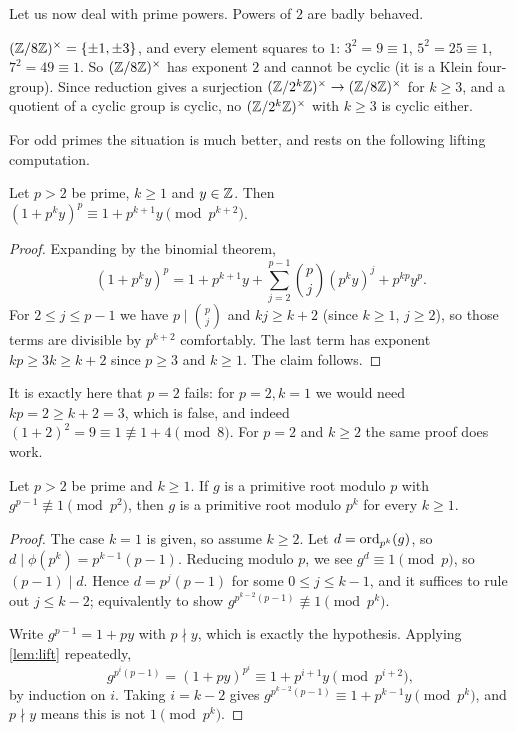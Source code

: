 \documentclass[a4paper]{scrartcl}
\begin{document}
Let us now deal with prime powers. Powers of $2$ are badly behaved.

\begin{example}
	$(\mathbb{Z}/8\mathbb{Z})^\times = \{\pm 1, \pm 3\}$, and every element squares to $1$: $3^2 = 9 \equiv 1$, $5^2 = 25 \equiv 1$, $7^2 = 49 \equiv 1$. So $(\mathbb{Z}/8\mathbb{Z})^\times$ has exponent $2$ and cannot be cyclic (it is a Klein four-group). Since reduction gives a surjection $(\mathbb{Z}/2^k\mathbb{Z})^\times \to (\mathbb{Z}/8\mathbb{Z})^\times$ for $k \geq 3$, and a quotient of a cyclic group is cyclic, no $(\mathbb{Z}/2^k\mathbb{Z})^\times$ with $k \geq 3$ is cyclic either.
\end{example}

For odd primes the situation is much better, and rests on the following lifting computation.

\begin{lemma}\label{lem:lift}
	Let $p > 2$ be prime, $k \geq 1$ and $y \in \mathbb{Z}$. Then $(1 + p^k y)^p \equiv 1 + p^{k+1}y \pmod{p^{k+2}}$.
\end{lemma}
\begin{proof}
	Expanding by the binomial theorem,
	$$
	(1 + p^k y)^p = 1 + p^{k+1}y + \sum_{j = 2}^{p-1} \binom{p}{j}(p^k y)^j + p^{kp}y^p.
	$$
	For $2 \leq j \leq p - 1$ we have $p \mid \binom pj$ and $kj \geq k + 2$ (since $k \geq 1$, $j \geq 2$), so those terms are divisible by $p^{k+2}$ comfortably. The last term has exponent $kp \geq 3k \geq k + 2$ since $p \geq 3$ and $k \geq 1$. The claim follows.
\end{proof}

\begin{remark}
	It is exactly here that $p = 2$ fails: for $p = 2, k = 1$ we would need $kp = 2 \geq k + 2 = 3$, which is false, and indeed $(1 + 2)^2 = 9 \equiv 1 \not\equiv 1 + 4 \pmod 8$. For $p = 2$ and $k \geq 2$ the same proof does work.
\end{remark}

\begin{lemma}\label{lem:primroot2}
	Let $p > 2$ be prime and $k \geq 1$. If $g$ is a primitive root modulo $p$ with $g^{p-1} \not\equiv 1 \pmod{p^2}$, then $g$ is a primitive root modulo $p^k$ for every $k \geq 1$.
\end{lemma}
\begin{proof}
	The case $k = 1$ is given, so assume $k \geq 2$. Let $d = \operatorname{ord}_{p^k}(g)$, so $d \mid \phi(p^k) = p^{k-1}(p-1)$. Reducing modulo $p$, we see $g^d \equiv 1 \pmod p$, so $(p - 1) \mid d$. Hence $d = p^{j}(p-1)$ for some $0 \leq j \leq k - 1$, and it suffices to rule out $j \leq k - 2$; equivalently to show $g^{p^{k-2}(p-1)} \not\equiv 1 \pmod{p^k}$.

	Write $g^{p-1} = 1 + py$ with $p \nmid y$, which is exactly the hypothesis. Applying \autoref{lem:lift} repeatedly,
	$$
	g^{p^{i}(p-1)} = (1 + py)^{p^i} \equiv 1 + p^{i+1}y \pmod{p^{i + 2}},
	$$
	by induction on $i$. Taking $i = k - 2$ gives $g^{p^{k-2}(p-1)} \equiv 1 + p^{k-1}y \pmod{p^{k}}$, and $p \nmid y$ means this is not $1 \pmod{p^k}$.
\end{proof}
\end{document}
